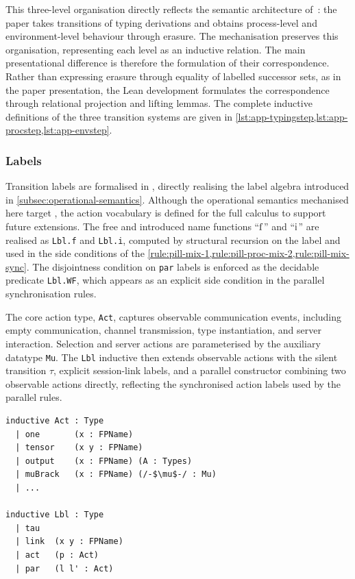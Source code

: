 This three-level organisation directly reflects the semantic architecture of~\citet{abs-2106-11818}: the paper takes transitions of typing derivations and obtains process-level and environment-level behaviour through erasure. The mechanisation preserves this organisation, representing each level as an inductive relation. The main presentational difference is therefore the formulation of their correspondence. Rather than expressing erasure through equality of labelled successor sets, as in the paper presentation, the Lean development formulates the correspondence through relational projection and lifting lemmas. The complete inductive definitions of the three transition systems are given in \cref{lst:app-typingstep,lst:app-procstep,lst:app-envstep}.

\subsubsection{Labels}\label{subsubsec:labels}
Transition labels are formalised in , directly realising the label algebra introduced in \cref{subsec:operational-semantics}. Although the operational semantics mechanised here target \pimll{}, the action vocabulary is defined for the full \pill{} calculus to support future extensions. The free and introduced name functions ``$\operatorname{f}$'' and ``$\operatorname{i}$'' are realised as \texttt{Lbl.f} and \texttt{Lbl.i}, computed by structural recursion on the label and used in the side conditions of the \cref{rule:pill-mix-1,rule:pill-proc-mix-2,rule:pill-mix-sync}. The disjointness condition on \texttt{par} labels is enforced as the decidable predicate \texttt{Lbl.WF}, which appears as an explicit side condition in the parallel synchronisation rules.

The core action type, \texttt{Act}, captures observable communication events, including empty communication, channel transmission, type instantiation, and server interaction. Selection and server actions are parameterised by the auxiliary datatype \texttt{Mu}. The \texttt{Lbl} inductive then extends observable actions with the silent transition $\tau$, explicit session-link labels, and a parallel constructor combining two observable actions directly, reflecting the synchronised action labels used by the parallel rules.

\begin{lstlisting}[language=Lean4]
inductive Act : Type
  | one       (x : FPName)
  | tensor    (x y : FPName)
  | output    (x : FPName) (A : Types)
  | muBrack   (x : FPName) (/-$\mu$-/ : Mu)
  | ...

inductive Lbl : Type
  | tau
  | link  (x y : FPName)
  | act   (p : Act)
  | par   (l l' : Act)
\end{lstlisting}

